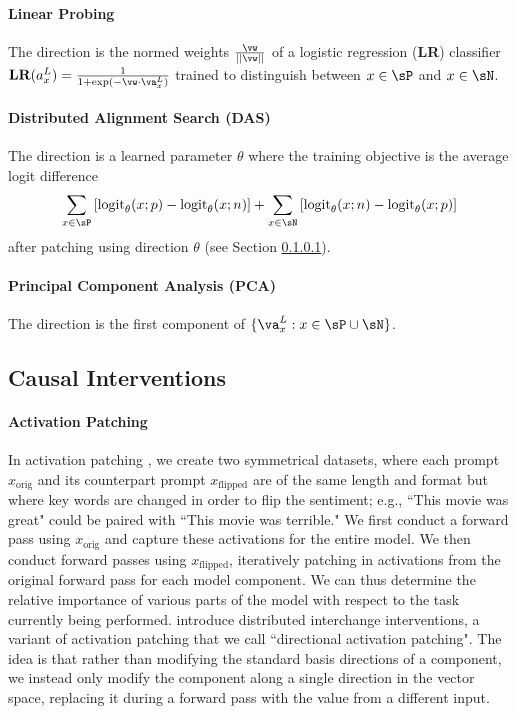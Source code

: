 \documentclass{article} %
\begin{document}
\paragraph{Linear Probing} The direction is the normed weights $\frac{\vw}{||\vw||}$ of a logistic regression (\textbf{LR}) classifier $\textbf{LR}(a_x^L) = \frac{1}{1+\exp(-\vw\cdot \va_x^L)}$ trained to distinguish between $x\in\sP$ and $x\in\sN$.

\paragraph{Distributed Alignment Search (DAS)}\label{method:das} \citep{das} The direction is a learned parameter $\theta$ where the training objective is the average logit difference 
\[ \sum_{x\in\sP} \left[ \textrm{logit}_\theta(x; p) - \textrm{logit}_\theta(x; n) \right] + \sum_{x\in\sN} \left[ \textrm{logit}_\theta(x; n) - \textrm{logit}_\theta(x; p) \right] \]
after patching using direction $\theta$ (see Section \ref{method:act-patching}).

\paragraph{Principal Component Analysis (PCA)} The direction is the first component of $\{\va^L_{x}: x \in \sP \cup \sN\}$.

\subsection{Causal Interventions}\label{section:causal-methods}

\paragraph{Activation Patching}\label{method:act-patching} In activation patching \citep{geiger-etal-2020-neural, vig2020causal}, we create two symmetrical datasets, where each prompt $x_\text{orig}$ and its counterpart prompt $x_\text{flipped}$ are of the same length and format but where key words are changed in order to flip the sentiment; e.g., ``This movie was great" could be paired with ``This movie was terrible." We first conduct a forward pass using $x_\text{orig}$ and capture these activations for the entire model. We then conduct forward passes using $x_\text{flipped}$, iteratively patching in activations from the original forward pass for each model component. We can thus determine the relative importance of various parts of the model with respect to the task currently being performed.
\cite{das} introduce distributed interchange interventions, a variant of activation patching that we call ``\gls{directional activation patching}". The idea is that rather than modifying the standard basis directions of a component, we instead only modify the component along a single direction in the vector space, replacing it during a forward pass with the value from a different input. 
\end{document}
